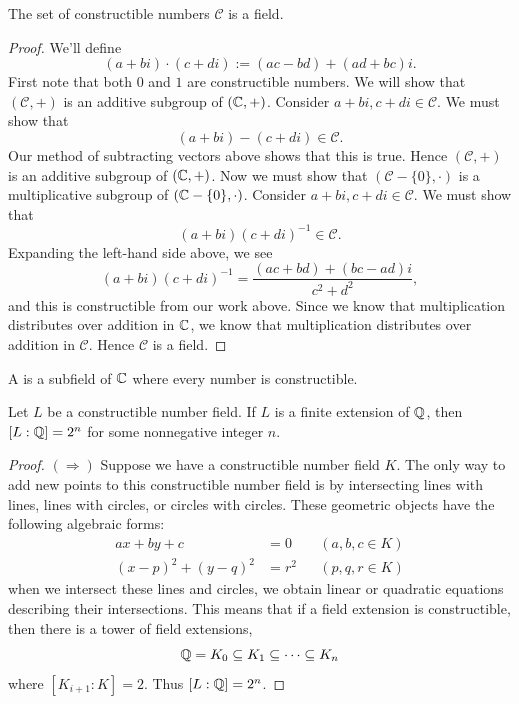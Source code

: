 \documentclass{ximera}
\begin{document}
\begin{lemma}
  The set of constructible numbers $\mathcal{C}$ is a field.
  \begin{proof}
    We'll define
    \[
    (a+ bi)\cdot(c+di) := (ac-bd) + (ad+bc)i.
    \]
    First note that both $0$ and $1$ are constructible numbers. We
    will show that $(\mathcal{C},+)$ is an additive subgroup of
    $(\mathbb C,+)$. Consider $a+ bi, c+di \in \mathcal{C}$. We must show
    that
    \[
    (a+ bi)-(c+di)\in \mathcal{C}.
    \]
    Our method of subtracting vectors above shows that this is
    true. Hence $(\mathcal{C},+)$ is an additive subgroup of
    $(\mathbb C,+)$. Now we must show that $(\mathcal{C}-\{0\},\cdot)$ is a
    multiplicative subgroup of $(\mathbb C-\{0\},\cdot)$. Consider $a+ bi,
    c+di \in \mathcal{C}$. We must show that
    \[
    (a+ bi)(c+di)^{-1} \in \mathcal{C}.
    \]
    Expanding the left-hand side above, we see
    \[
    (a+ bi)(c+di)^{-1} = \frac{(ac+bd) + (bc-ad)i}{c^2 + d^2},
    \]
    and this is constructible from our work above. Since we know that
    multiplication distributes over addition in $\mathbb C$, we know that
    multiplication distributes over addition in $\mathcal{C}$. Hence
    $\mathcal{C}$ is a field.
  \end{proof}
\end{lemma}


\begin{definition}
  A  is a subfield of $\mathbb C$ where every
  number is constructible.
\end{definition}

\begin{theorem}
  Let $L$ be a constructible number field. If $L$ is a finite
  extension of $\mathbb Q$, then $[L: \mathbb Q] = 2^n$ for some nonnegative integer
  $n$.
  \begin{proof}
    $(\Rightarrow)$ Suppose we have a constructible number field
    $K$. The only way to add new points to this constructible number
    field is by intersecting lines with lines, lines with circles, or
    circles with circles. These geometric objects have the following
    algebraic forms:
    \begin{align*}
      ax + by + c &= 0 & & (a,b,c\in K)\\
      (x-p)^2 + (y-q)^2 &= r^2 & & (p,q,r\in K)
    \end{align*}
    when we intersect these lines and circles, we obtain linear or
    quadratic equations describing their intersections. This means
    that if a field extension is constructible, then there is a tower
    of field extensions,
    \[
    \mathbb Q = K_0 \subseteq K_1 \subseteq \cdots \subseteq K_n
    \]
    where $[K_{i+1}:K] = 2$. Thus $[L:\mathbb Q]=2^n$.
  \end{proof}
\end{theorem}
\end{document}
